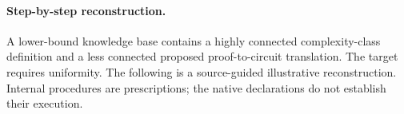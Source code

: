 %
%
%
\paragraph{Step-by-step reconstruction.}
A lower-bound knowledge base contains a highly connected complexity-class definition and a less connected proposed proof-to-circuit translation. The target requires uniformity.
The following is a source-guided illustrative reconstruction. Internal procedures are prescriptions; the native declarations do not establish their execution.
